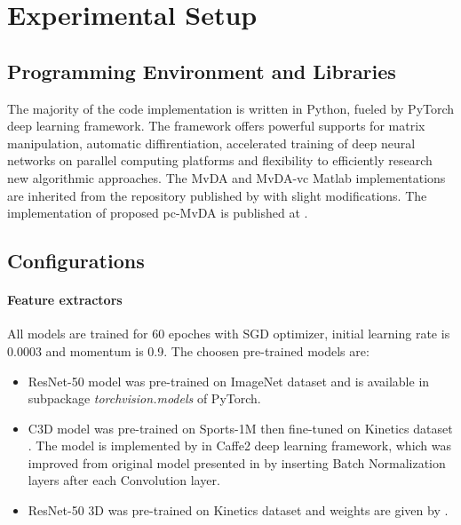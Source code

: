 
\section{Experimental Setup} \label{sec:experimental_setup}
    \subsection{Programming Environment and Libraries}
        The majority of the code implementation is written in Python, fueled by PyTorch \cite{NEURIPS2019_9015} deep learning framework.
        The framework offers powerful supports for matrix manipulation, automatic diffirentiation, accelerated training of deep neural networks on parallel computing platforms and flexibility to efficiently research new algorithmic approaches.
        The MvDA and MvDA-vc Matlab implementations are inherited from the repository published by \cite{kan2015multi} with slight modifications.
        The implementation of proposed pc-MvDA is published at .

    \subsection{Configurations}
        \paragraph{Feature extractors}
        All models are trained for 60 epoches with SGD optimizer, initial learning rate is 0.0003 and momentum is 0.9.
        The choosen pre-trained models are:
        \begin{itemize}
            \item{ResNet-50} model was pre-trained on ImageNet dataset and is available in subpackage \textit{torchvision.models} of PyTorch.
            \item{C3D} model was pre-trained on Sports-1M \cite{karpathy2014large} then fine-tuned on Kinetics dataset \cite{kay2017kinetics}. The model is implemented by \cite{VMZ} in Caffe2 deep learning framework, which was improved from original model presented in \cite{tran2015learning} by inserting Batch Normalization layers after each Convolution layer.
            \item{ResNet-50 3D} was pre-trained on Kinetics dataset and weights are given by \cite{hara2018can}.
        \end{itemize}

